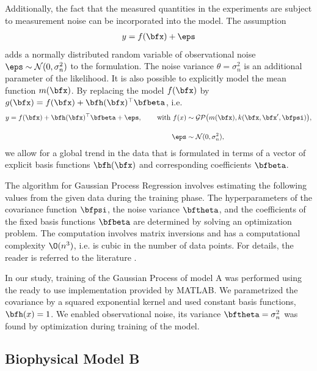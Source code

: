 Additionally, the fact that the measured quantities in the experiments are subject to measurement noise can be incorporated into the model.
The assumption 
\begin{equation*}
  \begin{array}{lll}
    y = f(\bfx) + \eps
  \end{array}
\end{equation*}
adds a normally distributed random variable of observational noise $\eps \sim \mathcal{N}(0,\sigma_n^2)$ to the formulation. The noise variance $\theta = \sigma_n^2$ is an additional parameter of the likelihood. 
It is also possible to explicitly model the mean function $m(\bfx)$. By replacing the model $f(\bfx)$ by $g(\bfx) = f(\bfx) + \bfh(\bfx)^\top \bfbeta$, i.e.
\begin{align*}
    y &= f(\bfx) + \bfh(\bfx)^\top \bfbeta + \eps, \quad 
    &\text{ with } f(x) &\sim\mathcal{GP} \big(m(\bfx), k(\bfx,\bfx',\bfpsi)\big),\\[4mm]
    && \eps &\sim \mathcal{N}(0,\sigma_n^2),
\end{align*}
we allow for a global trend in the data that is formulated in terms of a vector of explicit basis functions $\bfh(\bfx)$ and corresponding coefficients $\bfbeta$.

The algorithm for Gaussian Process Regression involves estimating the following values from the given data during the training phase. The hyperparameters of the covariance function $\bfpsi$, the noise variance $\bftheta$, and the coefficients of the fixed basis functions $\bfbeta$ are determined by solving an optimization problem. The computation involves matrix inversions and has a computational complexity $\O(n^3)$, i.e. is cubic in the number of data points. For details, the reader is referred to the literature \cite{Rasmussen2005,kuss2006gaussian}.

In our study, training of the Gaussian Process of model A was performed using the ready to use implementation provided by MATLAB.
We parametrized the covariance by a squared exponential kernel and used constant basis functions, $\bfh(x) = 1$. We enabled observational noise, its variance $\bftheta = \sigma_n^2$ was found by optimization during training of the model.

\subsection{Biophysical Model B}\label{sec:biophysical_model}

